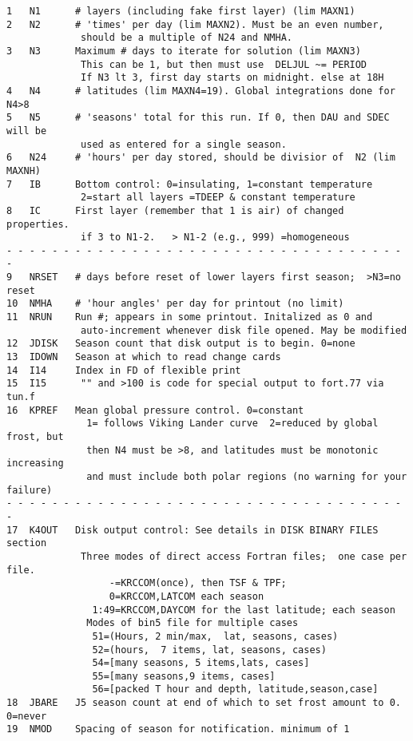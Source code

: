 \documentclass[draft]{article}  %
\begin{document}
\begin{verbatim}
1   N1      # layers (including fake first layer) (lim MAXN1)
2   N2      # 'times' per day (lim MAXN2). Must be an even number, 
             should be a multiple of N24 and NMHA.
3   N3      Maximum # days to iterate for solution (lim MAXN3)
             This can be 1, but then must use  DELJUL ~= PERIOD
             If N3 lt 3, first day starts on midnight. else at 18H 
4   N4      # latitudes (lim MAXN4=19). Global integrations done for N4>8
5   N5      # 'seasons' total for this run. If 0, then DAU and SDEC will be 
             used as entered for a single season.
6   N24     # 'hours' per day stored, should be divisior of  N2 (lim MAXNH)
7   IB      Bottom control: 0=insulating, 1=constant temperature 
             2=start all layers =TDEEP & constant temperature 
8   IC      First layer (remember that 1 is air) of changed properties. 
             if 3 to N1-2.   > N1-2 (e.g., 999) =homogeneous
- - - - - - - - - - - - - - - - - - - - - - - - - - - - - - - - - - - - 
9   NRSET   # days before reset of lower layers first season;  >N3=no reset
10  NMHA    # 'hour angles' per day for printout (no limit)
11  NRUN    Run #; appears in some printout. Initalized as 0 and   
             auto-increment whenever disk file opened. May be modified
12  JDISK   Season count that disk output is to begin. 0=none
13  IDOWN   Season at which to read change cards
14  I14     Index in FD of flexible print
15  I15      "" and >100 is code for special output to fort.77 via tun.f
16  KPREF   Mean global pressure control. 0=constant
              1= follows Viking Lander curve  2=reduced by global frost, but
              then N4 must be >8, and latitudes must be monotonic increasing
              and must include both polar regions (no warning for your failure)
- - - - - - - - - - - - - - - - - - - - - - - - - - - - - - - - - - - - 
17  K4OUT   Disk output control: See details in DISK BINARY FILES section
             Three modes of direct access Fortran files;  one case per file.
                  -=KRCCOM(once), then TSF & TPF;
                  0=KRCCOM,LATCOM each season
               1:49=KRCCOM,DAYCOM for the last latitude; each season
              Modes of bin5 file for multiple cases
               51=(Hours, 2 min/max,  lat, seasons, cases)
               52=(hours,  7 items, lat, seasons, cases)
               54=[many seasons, 5 items,lats, cases]
               55=[many seasons,9 items, cases]
               56=[packed T hour and depth, latitude,season,case]
18  JBARE   J5 season count at end of which to set frost amount to 0. 0=never
19  NMOD    Spacing of season for notification. minimum of 1

\end{verbatim}
\end{document}
